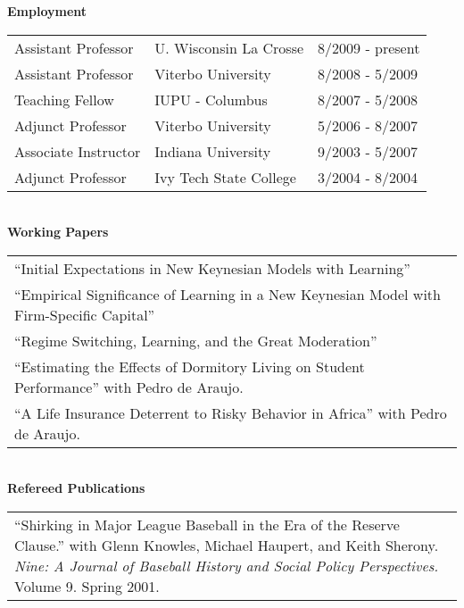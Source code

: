 \documentclass[11pt]{article}
\newcommand{\toprule}{\par\vspace*{2pt}\noindent{\hrule\hfill}\par\vspace*{1pt}}
\begin{document}
\textbf{Employment} \toprule
\hspace*{-0.5pc}\begin{tabular}{p{1.5in} p{1.7in} p{1.5in}}
Assistant Professor & U. Wisconsin La Crosse & 8/2009 - present \\
Assistant Professor & Viterbo University & 8/2008 - 5/2009 \\
Teaching Fellow & IUPU - Columbus & 8/2007 - 5/2008 \\
Adjunct Professor & Viterbo University & 5/2006 - 8/2007 \\
Associate Instructor & Indiana University & 9/2003 - 5/2007 \\
Adjunct Professor & Ivy Tech State College & 3/2004 - 8/2004 \\
\end{tabular} \\ 

\textbf{Working Papers} \toprule
\hspace*{-0.5pc}\begin{tabular}{p{6.5in}}
``Initial Expectations in New Keynesian Models with Learning''\\
``Empirical Significance of Learning in a New Keynesian Model with Firm-Specific Capital''\\
``Regime Switching, Learning, and the Great Moderation'' \\
``Estimating the Effects of Dormitory Living on Student Performance'' with Pedro de Araujo.\\
``A Life Insurance Deterrent to Risky Behavior in Africa'' with Pedro de Araujo.
\end{tabular} \\

\textbf{Refereed Publications} \toprule
\hspace*{-0.5pc}\begin{tabular}{p{6.2in}}
``Shirking in Major League Baseball in the Era of the Reserve Clause.'' with Glenn Knowles, Michael Haupert, and Keith Sherony. \textit{Nine: A Journal of Baseball History and Social Policy Perspectives.}  Volume 9. Spring 2001. \\
\end{tabular} \\
\end{document}
